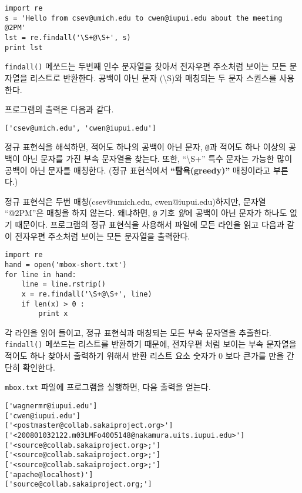 
\beforeverb
\begin{verbatim}
import re
s = 'Hello from csev@umich.edu to cwen@iupui.edu about the meeting @2PM'
lst = re.findall('\S+@\S+', s)
print lst
\end{verbatim}
\afterverb
%

{\tt findall()} 메쏘드는 두번째 인수 문자열을 찾아서 전자우편 주소처럼 보이는 모든 문자열을 리스트로 반환한다.
공백이 아닌 문자 ({\textbackslash}S)와 매칭되는 두 문자 스퀀스를 사용한다.

프로그램의 출력은 다음과 같다.

\beforeverb
\begin{verbatim}
['csev@umich.edu', 'cwen@iupui.edu']
\end{verbatim}
\afterverb
%

정규 표현식을 해석하면, 적어도 하나의 공백이 아닌 문자, {\verb"@"}과 적어도 하나 이상의 공백이 아닌 문자를 가진 부속 문자열을 찾는다.
또한, ``{\textbackslash}S+'' 특수 문자는 가능한 많이 공백이 아닌 문자를 매칭한다. (정규 표현식에서  {\bf ``탐욕(greedy)''} 매칭이라고 부른다.)

정규 표현식은 두번 매칭(csev@umich.edu, cwen@iupui.edu)하지만, 문자열 ``@2PM''은 매칭을 하지 않는다.
왜냐하면, {\verb"@"} 기호 {\em 앞}에 공백이 아닌 문자가 하나도 없기 때문이다.
프로그램의 정규 표현식을 사용해서 파일에 모든 라인을 읽고 다음과 같이 전자우편 주소처럼 보이는 모든 문자열을 출력한다.

\beforeverb
\begin{verbatim}
import re
hand = open('mbox-short.txt')
for line in hand:
    line = line.rstrip()
    x = re.findall('\S+@\S+', line)
    if len(x) > 0 :
        print x
\end{verbatim}
\afterverb
%
각 라인을 읽어 들이고, 정규 표현식과 매칭되는 모든 부속 문자열을 추출한다. 
{\tt findall()} 메쏘드는 리스트를 반환하기 때문에, 전자우편 처럼 보이는 부속 문자열을 적어도 하나 찾아서 출력하기 위해서 
반환 리스트 요소 숫자가 0 보다 큰가를 만을 간단히 확인한다.

{\tt mbox.txt} 파일에 프로그램을 실행하면, 다음 출력을 얻는다.

\beforeverb
\begin{verbatim}
['wagnermr@iupui.edu']
['cwen@iupui.edu']
['<postmaster@collab.sakaiproject.org>']
['<200801032122.m03LMFo4005148@nakamura.uits.iupui.edu>']
['<source@collab.sakaiproject.org>;']
['<source@collab.sakaiproject.org>;']
['<source@collab.sakaiproject.org>;']
['apache@localhost)']
['source@collab.sakaiproject.org;']
\end{verbatim}
\afterverb
%

